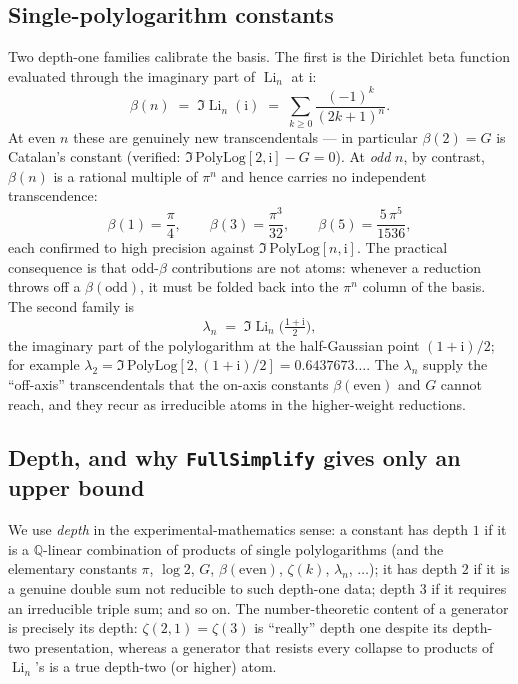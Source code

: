 \documentclass[11pt]{article}
\DeclareMathOperator{\Li}{Li}
\newcommand{\iu}{\mathrm{i}}
\theoremstyle{plain}
\theoremstyle{remark}
\begin{document}
\subsection{Single-polylogarithm constants}

Two depth-one families calibrate the basis. The first is the Dirichlet beta function evaluated through the imaginary part of $\Li_n$ at $\iu$:
\[
  \beta(n) \;=\; \Im\Li_n(\iu) \;=\; \sum_{k\ge 0} \frac{(-1)^{k}}{(2k+1)^{n}} .
\]
At even $n$ these are genuinely new transcendentals --- in particular $\beta(2)=G$ is Catalan's constant (verified: $\Im\,\mathrm{PolyLog}[2,\iu]-G=0$). At \emph{odd} $n$, by contrast, $\beta(n)$ is a rational multiple of $\pi^{n}$ and hence carries no independent transcendence:
\[
  \beta(1)=\frac{\pi}{4},\qquad
  \beta(3)=\frac{\pi^{3}}{32},\qquad
  \beta(5)=\frac{5\,\pi^{5}}{1536},
\]
each confirmed to high precision against $\Im\,\mathrm{PolyLog}[n,\iu]$. The practical consequence is that odd-$\beta$ contributions are not atoms: whenever a reduction throws off a $\beta(\text{odd})$, it must be folded back into the $\pi^{n}$ column of the basis. The second family is
\[
  \lambda_n \;=\; \Im\Li_n\!\Big(\tfrac{1+\iu}{2}\Big),
\]
the imaginary part of the polylogarithm at the half-Gaussian point $(1+\iu)/2$; for example $\lambda_2=\Im\,\mathrm{PolyLog}[2,(1+\iu)/2]=0.6437673\ldots$. The $\lambda_n$ supply the ``off-axis'' transcendentals that the on-axis constants $\beta(\text{even})$ and $G$ cannot reach, and they recur as irreducible atoms in the higher-weight reductions.

\subsection{Depth, and why \texttt{FullSimplify} gives only an upper bound}

We use \emph{depth} in the experimental-mathematics sense: a constant has depth $1$ if it is a $\mathbb{Q}$-linear combination of products of single polylogarithms (and the elementary constants $\pi$, $\log 2$, $G$, $\beta(\text{even})$, $\zeta(k)$, $\lambda_n$, $\dots$); it has depth $2$ if it is a genuine double sum not reducible to such depth-one data; depth $3$ if it requires an irreducible triple sum; and so on. The number-theoretic content of a generator is precisely its depth: $\zeta(2,1)=\zeta(3)$ is ``really'' depth one despite its depth-two presentation, whereas a generator that resists every collapse to products of $\Li_n$'s is a true depth-two (or higher) atom.
\end{document}
